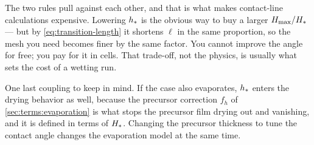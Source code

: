 The two rules pull against each other, and that is what makes contact-line
calculations expensive. Lowering $h_{*}$ is the obvious way to buy a larger
$H_{\mathrm{max}}/H_{*}$ --- but by \cref{eq:transition-length} it shortens $\ell$ in the
same proportion, so the mesh you need becomes finer by the same factor. You
cannot improve the angle for free; you pay for it in cells. That trade-off, not
the physics, is usually what sets the cost of a wetting run.

One last coupling to keep in mind. If the case also evaporates, $h_{*}$ enters
the drying behavior as well, because the precursor correction $f_h$ of
\cref{sec:terms:evaporation} is what stops the precursor film drying out and
vanishing, and it is defined in terms of $H_{*}$. Changing the precursor
thickness to tune the contact angle changes the evaporation model at the same
time.

